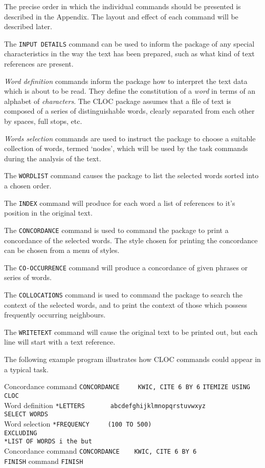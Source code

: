 The precise order in which the individual commands should be
presented is described in the Appendix.  The layout and effect of
each command will be described later.

The \verb/INPUT DETAILS/ command can be used to inform the package
of any special characteristics in the way the text has been prepared,
such as what kind of text references are present.

{\em Word definition} commands inform the package how to interpret the text
data which is about to be read.  They define the constitution of a
{\em word} in terms of an alphabet of {\em characters}. The CLOC package
assumes that a file of text is composed of a series of distinguishable
words, clearly separated from each other by spaces, full stops, etc.

{\em Words selection} commands are used to instruct the package to choose a
suitable collection of words, termed `nodes', which will be used by the
task commands during the analysis of the text.

The \verb/WORDLIST/ command causes the package to list the selected words
sorted into a chosen order.

The \verb/INDEX/ command will produce for each word a list of references to
it's position in the original text.

The \verb/CONCORDANCE/ command is used to command the package to print a
concordance of the selected words.  The style chosen for printing the
concordance can be chosen from a menu of styles.

The \verb/CO-OCCURRENCE/ command will produce a concordance of given phrases or
series of words.

The \verb/COLLOCATIONS/ command is used to command the package to search the
context of the selected words, and to print the context of those
which possess frequently occurring neighbours.

The \verb/WRITETEXT/ command will cause the original text to be printed out,
but each line will start with a text reference.

The following example program illustrates how CLOC commands
could appear in a typical task.
\begin{tabbing}
Concordance command \=\verb/CONCORDANCE     KWIC, CITE 6 BY 6/\kill
                    \>\verb/ITEMIZE USING  CLOC/\\
Word definition     \>\verb/*LETTERS       abcdefghijklmnopqrstuvwxyz/\\
                    \>\verb/SELECT WORDS/\\
Word selection      \>\verb/*FREQUENCY     (100 TO 500)/\\
                    \>\verb/EXCLUDING/\\
                    \>\verb/*LIST OF WORDS i the but/\\
Concordance command \>\verb/CONCORDANCE    KWIC, CITE 6 BY 6/\\
\verb/FINISH/ command      \>\verb/FINISH/
\end{tabbing}

